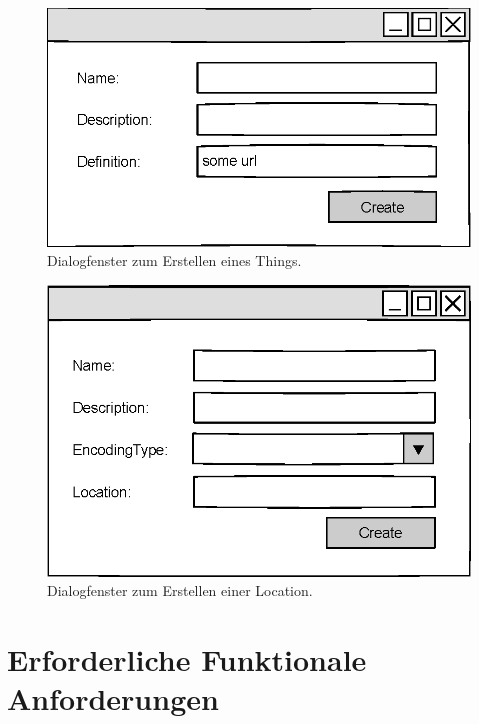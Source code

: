 \documentclass[12 pt]{article}
\begin{document}
\begin{figure}[htbp]
\centering
\includegraphics[scale=1]{images/oprop}
\caption{\label{fig:oprop}Dialogfenster zum Erstellen eines Things.}
\end{figure}

\begin{figure}[htbp]
\centering
\includegraphics[scale=1]{images/loc}
\caption{\label{fig:loc}Dialogfenster zum Erstellen einer Location.}
\end{figure}
	
	\section{Erforderliche Funktionale Anforderungen}
	
\end{document}
